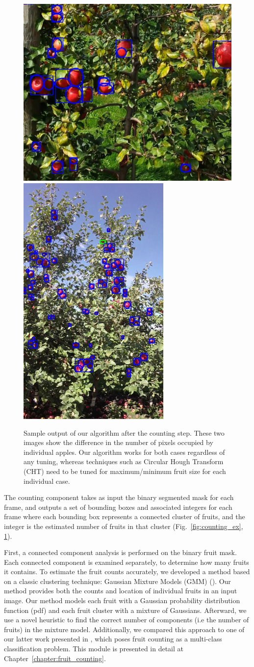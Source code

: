 \begin{figure}[!hbpt]
\includegraphics[width=.58\columnwidth]{figures/prelim/complex_count1.jpg}
\includegraphics[width=.32\columnwidth]{figures/prelim/CountFullComplex11.jpg}
\caption{Sample output of our algorithm after the counting step. These two images show the difference in the number of pixels occupied by individual apples. Our algorithm works for both cases regardless of any tuning, whereas techniques such as Circular Hough Transform (CHT) need to be tuned for maximum/minimum fruit size for each individual case.}
\label{fig:full_count}
\end{figure}
The counting component takes as input the binary segmented mask for each frame, and outputs a set of bounding boxes and associated integers for each frame where each bounding box represents a connected cluster of fruits, and the integer is the estimated number of fruits in that cluster (Fig.~\ref{fig:counting_ex}, \ref{fig:full_count}).

First, a connected component analysis is performed on the binary fruit mask. Each connected component is examined separately, to determine how many fruits it contains. To estimate the fruit counts accurately, we developed a method based on a classic clustering technique: Gaussian Mixture Models (GMM) (\cite{em}). Our method provides both the counts and location of individual fruits in an input image. Our method models each fruit with a Gaussian probability distribution function (pdf) and each fruit cluster with a mixture of Gaussians. Afterward, we use a novel heuristic to find the correct number of components (i.e the number of fruits) in the mixture model. Additionally, we compared this approach to one of our latter work presented in \cite{hani_apple_2018}, which poses fruit counting as a multi-class classification problem. This module is presented in detail at Chapter~\ref{chapter:fruit_counting}. 


